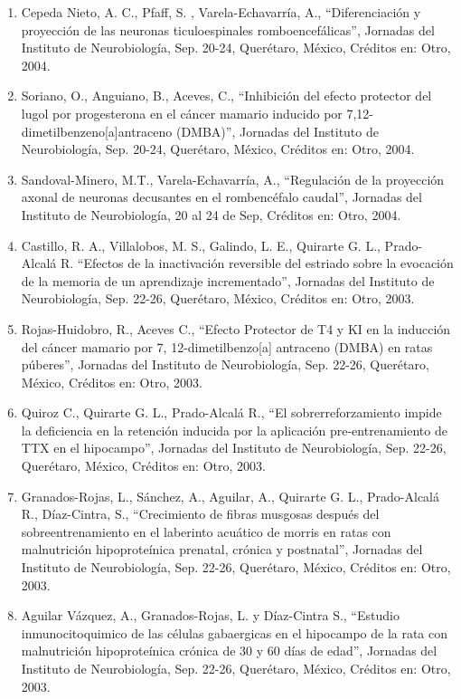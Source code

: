 \begin{enumerate}
\item Cepeda Nieto, A. C., Pfaff, S. , Varela-Echavarría, A., “Diferenciación y proyección de las neuronas ticuloespinales 
romboencefálicas”, Jornadas del Instituto de Neurobiología, Sep. 20-24, Querétaro, México, Créditos en: Otro, 2004.

\item Soriano, O., Anguiano, B., Aceves, C., “Inhibición del efecto protector del lugol por progesterona en el cáncer mamario 
inducido por 7,12-dimetilbenzeno[a]antraceno (DMBA)”, Jornadas del Instituto de Neurobiología, Sep. 20-24, Querétaro, México, 
Créditos en: Otro, 2004.

\item Sandoval-Minero, M.T., Varela-Echavarría, A., “Regulación de la proyección axonal de neuronas decusantes en el 
rombencéfalo caudal”, Jornadas del Instituto de Neurobiología, 20 al 24 de Sep, Créditos en: Otro, 2004.

\item Castillo, R. A., Villalobos, M. S., Galindo, L. E., Quirarte G. L., Prado-Alcalá R. “Efectos de la inactivación 
reversible del estriado sobre la evocación de la memoria de un aprendizaje incrementado”, Jornadas del Instituto de 
Neurobiología, Sep. 22-26, Querétaro, México, Créditos en: Otro, 2003.

\item Rojas-Huidobro, R., Aceves C., “Efecto Protector de T4 y KI en la inducción del cáncer mamario por 7, 
12-dimetilbenzo[a] 
antraceno (DMBA) en ratas púberes”, Jornadas del Instituto de Neurobiología, Sep. 22-26, Querétaro, México, Créditos en: 
Otro, 2003.

\item Quiroz C., Quirarte G. L., Prado-Alcalá R., “El sobrerreforzamiento impide la deficiencia en la retención inducida por 
la 
aplicación pre-entrenamiento de TTX en el hipocampo”, Jornadas del Instituto de Neurobiología, Sep. 22-26, Querétaro, México, 
Créditos en: Otro, 2003.

\item Granados-Rojas, L., Sánchez, A., Aguilar, A., Quirarte G. L., Prado-Alcalá R., Díaz-Cintra, S., “Crecimiento de fibras 
musgosas después del sobreentrenamiento en el laberinto acuático de morris en ratas con malnutrición hipoproteínica prenatal, 
crónica y postnatal”, Jornadas del Instituto de Neurobiología, Sep. 22-26, Querétaro, México, Créditos en: Otro, 2003.

\item Aguilar Vázquez, A., Granados-Rojas, L. y Díaz-Cintra S., “Estudio inmunocitoquimico de las
células gabaergicas en el hipocampo de la rata con malnutrición hipoproteínica crónica de 30 y 60 días de edad”, Jornadas del 
Instituto de Neurobiología, Sep. 22-26, Querétaro, México, Créditos en: Otro, 2003.


\end{enumerate}
